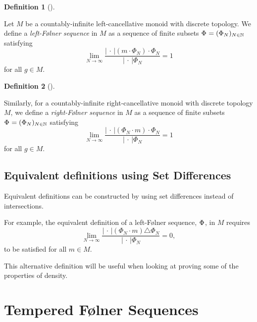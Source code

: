\documentclass[
  british,
]{article}
\theoremstyle{plain}
\theoremstyle{definition}
\newtheorem{definition}{Definition}[section]
\theoremstyle{remark}
\newcommand{\Monoid}{{M}}
\newcommand{\MonoidOperation}[2]{{#1}\cdot{#2}}
\newcommand{\Folner}[1][\vphantom{}]{{\Phi}_{#1}}
\newcommand{\MonoidElement}{{m}}
\newcommand{\CountingMeasure}[1][\,\cdot\,]{{\left|#1\right|}}
\begin{document}
\begin{definition}[]\protect\hypertarget{def-rightFolnerMonoid}{}\label{def-rightFolnerMonoid}

Let \(\Monoid\) be a countably-infinite left-cancellative monoid with
discrete topology. We define a \emph{left-Følner sequence} in
\(\Monoid\) as a sequence of finite subsets
\(\Folner =(\Folner[N])_{N\in\mathbb{N}}\) satisfying
\[\lim_{N\rightarrow\infty}\frac{\CountingMeasure{\MonoidOperation{(\MonoidOperation{\MonoidElement}{\Folner[N]})}{\Folner[N]}}}{\CountingMeasure{\Folner[N]}}=1\]
for all \(g\in M\).

\end{definition}

\begin{definition}[]\protect\hypertarget{def-leftFolnerMonoid}{}\label{def-leftFolnerMonoid}

Similarly, for a countably-infinite right-cancellative monoid with
discrete topology \(\Monoid\), we define a \emph{right-Følner sequence}
in \(\Monoid\) as a sequence of finite subsets
\(\Folner =(\Folner[N])_{N\in\mathbb{N}}\) satisfying
\[\lim_{N\rightarrow\infty}\frac{\CountingMeasure{\MonoidOperation{(\MonoidOperation{\Folner[N]}{\MonoidElement})}{\Folner[N]}}}{\CountingMeasure{\Folner[N]}}=1\]
for all \(g\in M\).

\end{definition}

\subsection{Equivalent definitions using Set
Differences}\label{equivalent-definitions-using-set-differences}

Equivalent definitions can be constructed by using set differences
instead of intersections.

For example, the equivalent definition of a left-Følner sequence,
\(\Folner\), in \(\Monoid\) requires
\[\lim_{N\rightarrow\infty}\frac{\CountingMeasure{(\MonoidOperation{\Folner[N]}{\MonoidElement})\triangle\Folner[N]}}{\CountingMeasure{\Folner[N]}}=0, \]
to be satisfied for all \(\MonoidElement\in\Monoid\).

This alternative definition will be useful when looking at proving some
of the properties of density.

\section{Tempered Følner Sequences}\label{tempered-fuxf8lner-sequences}
\end{document}
